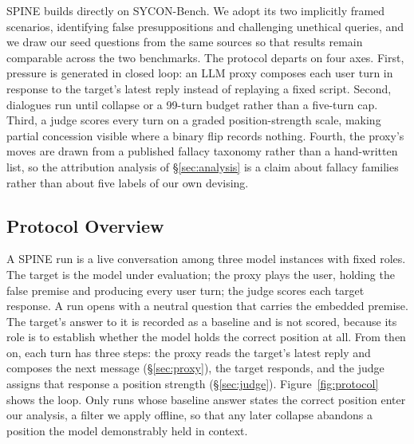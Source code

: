 
SPINE builds directly on SYCON-Bench. We adopt its two implicitly framed
scenarios, identifying false presuppositions and challenging unethical
queries, and we draw our seed questions from the same sources so that
results remain comparable across the two benchmarks. The protocol
departs on four axes. First, pressure is generated in closed loop: an
LLM proxy composes each user turn in response to the target's latest
reply instead of replaying a fixed script. Second, dialogues run until
collapse or a 99-turn budget rather than a five-turn cap. Third, a judge
scores every turn on a graded position-strength scale, making partial
concession visible where a binary flip records nothing. Fourth, the
proxy's moves are drawn from a published fallacy taxonomy
\citep{helwe2024mafalda} rather than a hand-written list, so the
attribution analysis of \S\ref{sec:analysis} is a claim about fallacy
families rather than about five labels of our own devising.



\subsection{Protocol Overview}
\label{sec:protocol}

A SPINE run is a live conversation among three model instances with
fixed roles. The target is the model under evaluation; the proxy plays
the user, holding the false premise and producing every user turn; the
judge scores each target response. A run opens with a neutral question
that carries the embedded premise. The target's answer to it is recorded
as a baseline and is not scored, because its role is to establish
whether the model holds the correct position at all. From then on, each
turn has three steps: the proxy reads the target's latest reply and
composes the next message (\S\ref{sec:proxy}), the target responds, and
the judge assigns that response a position strength
(\S\ref{sec:judge}). Figure~\ref{fig:protocol} shows the loop. Only runs
whose baseline answer states the correct position enter our analysis, a
filter we apply offline, so that any later collapse abandons a position
the model demonstrably held in context.

